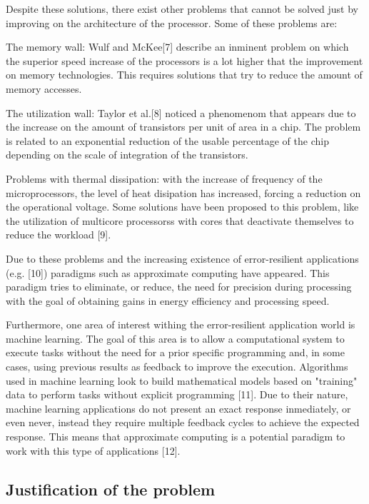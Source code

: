 Despite these solutions, there exist other problems that cannot be solved just by improving on the architecture
of the processor. Some of these problems are:

\begin{compactitem}
    \item The memory wall: Wulf and McKee[7] describe an inminent problem on which the superior speed increase
    of the processors is a lot higher that the improvement on memory technologies. This requires solutions that
    try to reduce the amount of memory accesses.
    \item The utilization wall: Taylor et al.[8] noticed a phenomenom that appears due to the increase on the amount
    of transistors per unit of area in a chip. The problem is related to an exponential reduction of the usable
    percentage of the chip depending on the scale of integration of the transistors.
    \item Problems with thermal dissipation: with the increase of frequency of the microprocessors, the level of 
    heat disipation has increased, forcing a reduction on the operational voltage. Some solutions have been proposed
    to this problem, like the utilization of multicore processorss with cores that deactivate themselves to reduce
    the workload [9].
\end{compactitem}

Due to these problems and the increasing existence of error-resilient applications (e.g. [10]) paradigms such as
approximate computing have appeared. This paradigm tries to eliminate, or reduce, the need for precision
during processing with the goal of obtaining gains in energy efficiency and processing speed.

Furthermore, one area of interest withing the error-resilient application world is machine learning.
The goal of this area is to allow a computational system to execute tasks without the need for a prior
specific programming and, in some cases, using previous results as feedback to improve the execution.
Algorithms used in machine learning look to build mathematical models based on "training" data to perform
tasks without explicit programming [11]. Due to their nature, machine learning applications do not present
an exact response inmediately, or even never, instead they require multiple feedback cycles to achieve
the expected response. This means that approximate computing is a potential paradigm to work with this
type of applications [12].

\subsection{Justification of the problem}

